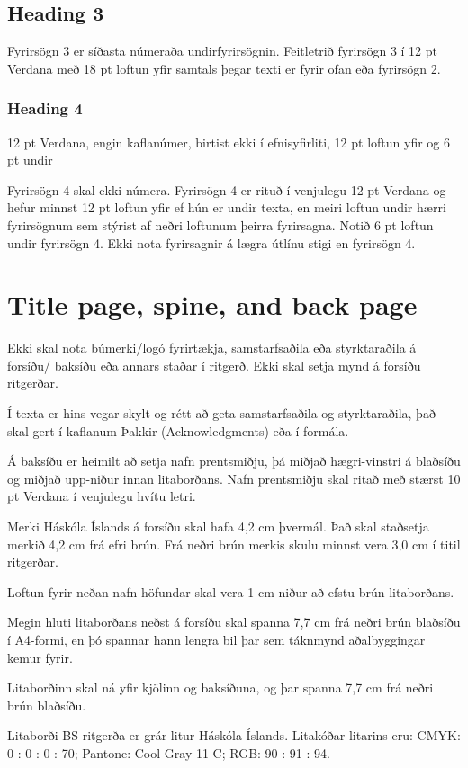 \documentclass[a4paper,12pt,twoside,BCOR=10mm]{scrbook}
\begin{document}
\subsection{Heading 3}
Fyrirsögn 3 er síðasta númeraða undirfyrirsögnin. Feitletrið fyrirsögn 3 í 12 pt Verdana með 18 pt loftun yfir samtals þegar texti er fyrir ofan eða fyrirsögn 2. 
\subsubsection{Heading 4}
12 pt Verdana, engin kaflanúmer, birtist ekki í efnisyfirliti, 12 pt loftun yfir og 6 pt undir

Fyrirsögn 4 skal ekki númera. Fyrirsögn 4 er rituð í venjulegu 12 pt Verdana og hefur minnst 12 pt loftun yfir ef hún er undir texta, en meiri loftun undir hærri fyrirsögnum sem stýrist af neðri loftunum þeirra fyrirsagna. Notið 6 pt loftun undir fyrirsögn 4.
Ekki nota fyrirsagnir á lægra útlínu stigi en fyrirsögn 4.

\section{Title page, spine, and back page}
Ekki skal nota búmerki/logó fyrirtækja, samstarfsaðila eða styrktaraðila á forsíðu/ baksíðu eða annars staðar í ritgerð. Ekki skal setja mynd á forsíðu ritgerðar. 

Í texta er hins vegar skylt og rétt að geta samstarfsaðila og styrktaraðila, það skal gert í kaflanum Þakkir (Acknowledgments) eða í formála.

Á baksíðu er heimilt að setja nafn prentsmiðju, þá miðjað hægri-vinstri á blaðsíðu og miðjað upp-niður innan litaborðans. Nafn prentsmiðju skal ritað með stærst 10 pt Verdana í venjulegu hvítu letri.

Merki Háskóla Íslands á forsíðu skal hafa 4,2 cm þvermál. Það skal staðsetja merkið 4,2 cm frá efri brún. Frá neðri brún merkis skulu minnst vera 3,0 cm í titil ritgerðar.

Loftun fyrir neðan nafn höfundar skal vera 1 cm niður að efstu brún litaborðans.

Megin hluti litaborðans neðst á forsíðu skal spanna 7,7 cm frá neðri brún blaðsíðu í A4-formi, en þó spannar hann lengra bil þar sem táknmynd aðalbyggingar kemur fyrir.

Litaborðinn skal ná yfir kjölinn og baksíðuna, og þar spanna 7,7 cm frá neðri brún blaðsíðu.

Litaborði BS ritgerða er grár litur Háskóla Íslands. Litakóðar litarins eru: CMYK: 0 : 0 : 0 : 70; Pantone: Cool Gray 11 C; RGB: 90 : 91 : 94.
\end{document}
